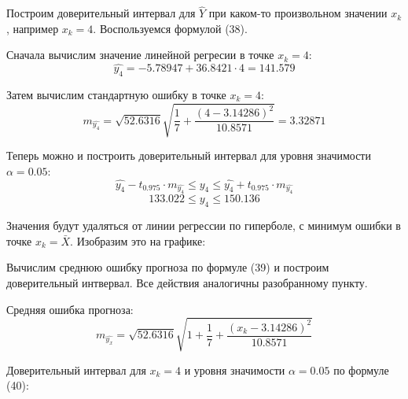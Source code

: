 \documentclass[aps,%
12pt,%
final,%
oneside,
onecolumn,%
musixtex, %
superscriptaddress,%
centertags]{article} %
\begin{document}
Построим доверительный интервал для $\widehat{Y}$ при каком-то произвольном значении $x_k$, например $x_k = 4$. Воспользуемся формулой (38).

Сначала вычислим значение линейной регресии в точке $x_k=4$:
$$ \widehat{y_{4}} = -5.78947 + 36.8421\cdot4 = 141.579$$

Затем вычислим стандартную ошибку в точке $x_k=4$:
$$ m_{\widehat{y_4}} = \sqrt{52.6316} \sqrt{\frac{1}{7} + \frac{(4-3.14286)^2}{10.8571}} = 3.32871$$

Теперь можно и построить доверительный интервал для уровня значимости $\alpha=0.05$:
$$ \widehat{y_{4}} - t_{0.975}\cdot m_{\widehat{y_4}} \leq \widehat{y_{4}} \leq \widehat{y_{4}} + t_{0.975}\cdot m_{\widehat{y_4}}$$
$$133.022 \leq \widehat{y_{4}} \leq150.136 $$

Значения будут удаляться от линии регрессии по гиперболе, с минимум ошибки в точке $x_k = \bar{X}$. Изобразим это на графике:

\begin{center}
\end{center}


Вычислим среднюю ошибку прогноза по формуле (39) и построим доверительный интвервал. Все действия аналогичны разобранному пункту.

Средняя ошибка прогноза:
$$ m_{\widehat{y_x}} = \sqrt{52.6316} \sqrt{1 + \frac{1}{7} + \frac{(x_k-3.14286)^2}{10.8571}} $$

Доверительный интервал для $x_k=4$ и уровня значимости $\alpha=0.05$ по формуле (40):
\end{document}
